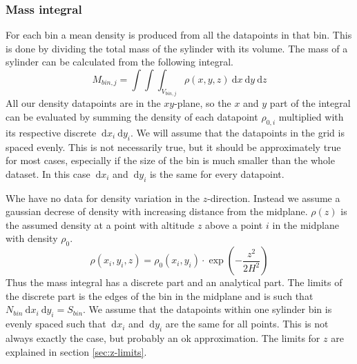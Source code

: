 \documentclass[a4paper, 12pt, english, titlepage]{article}
\newcommand{\D}[1]{\ \mathrm{d}#1} %
\begin{document}
    \subsubsection{Mass integral}
        For each bin a mean density is produced from all the datapoints in that bin. This is done by dividing the total mass of the sylinder with its volume. The mass of a sylinder can be calculated from the following integral.
        $$
        M_{bin,j} = \int\int\int_{V_{bin,j}} \rho(x,y,z) \D{x}\D{y}\D{z}
        $$
        All our density datapoints are in the $xy$-plane, so the $x$ and $y$ part of the integral can be evaluated by summing the density of each datapoint $\rho_{0,i}$ multiplied with its respective discrete $\D{x_i}\D{y_i}$. We will assume that the datapoints in the grid is spaced evenly. This is not necessarily true, but it should be approximately true for most cases, especially if the size of the bin is much smaller than the whole dataset. In this case $\D{x_i}$ and $\D{y_i}$ is the same for every datapoint.

        Whe have no data for density variation in the $z$-direction. Instead we assume a gaussian decrese of density with increasing distance from the midplane. $\rho(z)$ is the assumed density at a point with altitude $z$ above a point $i$ in the midplane with density $\rho_0$.
        $$
        \rho(x_i, y_i, z) = \rho_0(x_i, y_i) \cdot \exp\left(- \frac{z^2}{2H^2}\right)
        $$
        Thus the mass integral has a discrete part and an analytical part. The limits of the discrete part is the edges of the bin in the midplane and is such that $N_{bin} \D{x_i}\D{y_i} = S_{bin}$. We assume that the datapoints within one sylinder bin is evenly spaced such that $\D{x_i}$ and $\D{y_i}$ are the same for all points. This is not always exactly the case, but probably an ok approximation. The limits for $z$ are explained in section \ref{sec:z-limits}.
\end{document}
